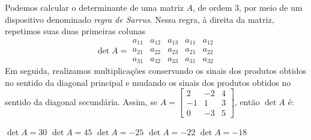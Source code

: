 Podemos calcular o determinante de uma matriz $A$, de ordem $3$, por meio de um dispositivo denominado {\it regra de Sarrus}. Nessa regra, à direita da matriz, repetimos suas duas primeiras colunas
\[\det A = \begin{array}{|ccc|cc}
a_{11} &  a_{12}  &  a_{13}  &  a_{11}  &  a_{12}\\
a_{21} &  a_{22}  &  a_{23}  &  a_{21}  &  a_{22}\\
a_{31} &  a_{32}  &  a_{33}  &  a_{31}  &  a_{32}
\end{array} \]
Em seguida, realizamos multiplicações conservando os sinais dos produtos obtidos no sentido da diagonal principal e mudando os sinais dos produtos obtidos no sentido da diagonal secundária. Assim,
se $A = \left[ \begin{array}{ccc}
     2  &  -2&     4\\
     -1  &   1 &    3\\
     0   & -3  &   5
\end{array} \right]$, então $\det A$ é:

$\det A = 30$
$\det A = 45$
$\det A = -25$
$\det A = -22$
$\det A = -18$


